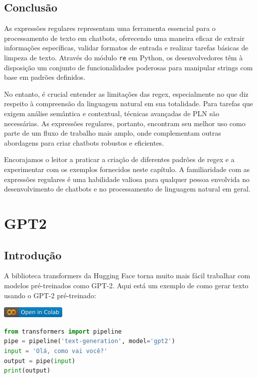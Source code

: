 \documentclass[14pt,a4paper,oneside]{book}
\begin{document}
\section{Conclusão}
As expressões regulares representam uma ferramenta essencial para o processamento de texto em chatbots, oferecendo uma maneira eficaz de extrair informações específicas, validar formatos de entrada e realizar tarefas básicas de limpeza de texto. Através do módulo \texttt{re} em Python, os desenvolvedores têm à disposição um conjunto de funcionalidades poderosas para manipular strings com base em padrões definidos.

No entanto, é crucial entender as limitações das regex, especialmente no que diz respeito à compreensão da linguagem natural em sua totalidade. Para tarefas que exigem análise semântica e contextual, técnicas avançadas de PLN são necessárias. As expressões regulares, portanto, encontram seu melhor uso como parte de um fluxo de trabalho mais amplo, onde complementam outras abordagens para criar chatbots robustos e eficientes.

Encorajamos o leitor a praticar a criação de diferentes padrões de regex e a experimentar com os exemplos fornecidos neste capítulo. A familiaridade com as expressões regulares é uma habilidade valiosa para qualquer pessoa envolvida no desenvolvimento de chatbots e no processamento de linguagem natural em geral.



\chapter{GPT2}

\section{Introdução}

A biblioteca transformers da Hugging Face torna muito mais fácil trabalhar com modelos pré-treinados como GPT-2. Aqui está um exemplo de como gerar texto usando o GPT-2 pré-treinado:

\vspace{\baselineskip}
\href{https://colab.research.google.com/github/giseldo/chatbotbook/blob/main/notebook/cap12.ipynb}{
  \includegraphics{./fig/colab-badge.png}
}

\begin{lstlisting}[language=Python, caption=Exemplo de uso do GPT-2 com a biblioteca transformers, label=lst:gpt2_exemplo]
from transformers import pipeline
pipe = pipeline('text-generation', model='gpt2')
input = 'Olá, como vai você?'
output = pipe(input)
print(output)
\end{lstlisting}
\end{document}

